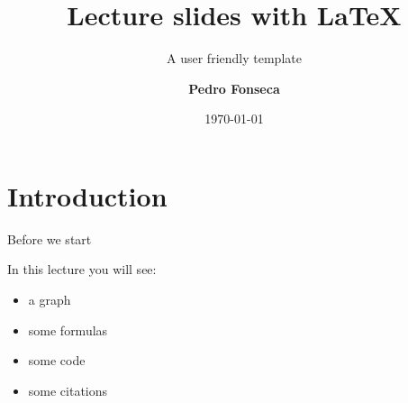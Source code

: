 


\title[Lecture slides with LaTeX]{Lecture slides with \LaTeX}
\subtitle{A user friendly template}

\author[Pedro Fonseca]{\textbf {Pedro Fonseca}}

\date{\today}








\section{Introduction}


\begin{frame}{Before we start}

In this lecture you will see:

\begin{itemize}

\item a graph
\item some formulas
\item some code
\item some citations \citep{kass1995}

\end{itemize}

\end{frame}


